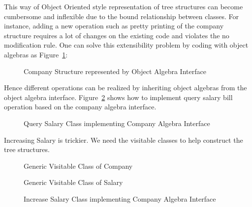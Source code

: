This way of Object Oriented style representation of tree structures can become cumbersome and inflexible due to the bound relationship between classes. For instance, adding a new operation such as pretty printing of the company structure requires a lot of changes on the existing code and violates the no modification rule. One can solve this extensibility problem by coding with object algebras as Figure~\ref{syb_tree}: 
\begin{figure}[tb]
\vspace{-.1in}
\caption{Company Structure represented by Object Algebra Interface}
\label{syb_tree}
\end{figure}

Hence different operations can be realized by inheriting object algebras from the object algebra interface. Figure~\ref{query_salary} shows how to implement query salary bill operation based on the company algebra interface.  
\begin{figure}[tb]
\vspace{-.1in}
\caption{Query Salary Class implementing Company Algebra Interface}
\label{query_salary}
\end{figure}

Increasing Salary is trickier. We need the visitable classes to help construct the tree structures. 
\begin{figure}[tb]
\vspace{-.1in}
\caption{Generic Visitable Class of Company}
\label{g_company}
\end{figure}
\begin{figure}[tb]
\vspace{-.1in}
\caption{Generic Visitable Class of Salary}
\label{g_salary}
\end{figure}
\begin{figure}[tb]
\vspace{-.1in}
\caption{Increase Salary Class implementing Company Algebra Interface}
\label{increase_salary}
\end{figure}

